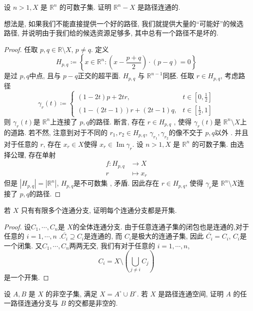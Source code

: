 \documentclass[../main.tex]{subfiles}
\begin{document}
\begin{exercise}{}{}
设 $n > 1, X$ 是 $\mathbb{R}^n$ 的可数子集. 证明 $\mathbb{R}^n - X$ 是路径连通的.
\end{exercise}
\begin{note}
    想法是, 如果我们不能直接提供一个好的路径, 我们就提供大量的``可能好''的候选路径, 并说明由于我们给的候选资源足够多, 其中总有一个路径不是坏的.
\end{note}
\begin{proof}
 任取 \(  p,q\in \mathbb{R} \setminus X  \), \(  p\neq q  \). 定义 \[
 H_{p,q}\coloneqq \left\{ x\in \mathbb{R} ^{n}: \left( x-\frac{p+ q }{2 }  \right) \cdot \left( p-q \right)= 0  \right\}
 \]  是过 \(  p,q  \)中点, 且与 \(  p-q  \)正交的超平面. \(  H_{p,q}  \)   与 \(  \mathbb{R} ^{n-1}  \)同胚. 任取 \(  r \in H_{p,q}  \), 考虑路径 \[
  \gamma _{r}\left( t \right)\coloneqq \begin{cases} \left( 1-2t \right)p+ 2tr,& t \in \left[ 0,\frac{1 }{2 }  \right]\\ 
   \left( 1-\left( 2t-1 \right)  \right)r+ \left( 2t-1 \right)q,& t \in \left[ \frac{1 }{2 },1  \right]      \end{cases}  
 \]  则 \(   \gamma _{r}\left( t \right)   \)是 \(  \mathbb{R} ^{n}  \)上连接了 \(  p,q  \)的路径. 断言, 存在 \(  r \in H_{p,q}  \)    , 使得 \(   \gamma _{r}\left( t \right)   \)是 \(  \mathbb{R} ^{n}\setminus X  \)上的道路.  若不然, 注意到对于不同的 \(  r_1,r_2\in H_{p,q}  \), \(   \gamma _{r_1},  \gamma _{r_2}  \)的像不交于 \(  p,q  \)以外 . 并且对于任意的 \(  r  \), 存在 \(  x_{r} \in X  \)使得 \(  x_{r} \in \operatorname{Im} \gamma _{r}  \). 设 $n > 1, X$ 是 $\mathbb{R}^n$ 的可数子集. 由选择公理, 存在单射 \[
\begin{aligned}
f: H_{p,q}&\to X\\ 
 r&\mapsto  x_{r}
\end{aligned}
 \]     但是 \(  \left| H_{p,q} \right|= \left| \mathbb{R} ^{n} \right|    \),   \(  H_{p,q}  \)是不可数集   , 矛盾. 因此存在 \(  r \in H_{p,q}  \), 使得 \(   \gamma _{r}  \)是 \(  \mathbb{R} ^{n}\setminus X  \)连接了 \(  p,q  \)的路径.    
\end{proof}
\begin{exercise}{}{}
若 $X$ 只有有限多个连通分支, 证明每个连通分支都是开集.
\end{exercise}

\begin{proof}
    设\(  C_{1},\cdots ,C_{n}  \)是 \(  X  \)的全体连通分支.  由于任意连通子集的闭包也是连通的,对于任意的 \(  i=  1,\cdots,n   \)  .\(  \overline{C_{i}}\supseteq C_{i}  \)是连通的, 而 \(  C_{i}  \)是极大的连通子集, 因此 \(  \overline{C_{i}}= C_{i}  \), \(  C_{i}  \)是一个闭集.  又\(  C_1,\cdots ,C_{n}  \)两两无交, 我们有对于任意的 \(  i=  1,\cdots,n   \), \[
    C_{i}= X\setminus \left( \bigcup _{j\neq i}C_{j} \right) 
    \]是一个开集.  
\end{proof}
\begin{exercise}{}{}
设 $A, B$ 是 $X$ 的非空子集, 满足 $X = A^\circ \cup B^\circ$. 若 $X$ 是路径连通空间, 证明 $A$ 的任一路径连通分支与 $B$ 的交都是非空的.
\end{exercise}
\end{document}
